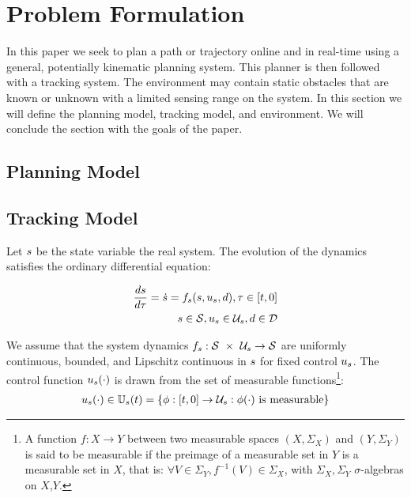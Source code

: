 \section{Problem Formulation \label{sec:formulation}}
In this paper we seek to plan a path or trajectory online and in real-time using a general, potentially kinematic planning system. This planner is then followed with a tracking system. The environment may contain static obstacles that are known or unknown with a limited sensing range on the system. In this section we will define the planning model, tracking model, and environment. We will conclude the section with the goals of the paper.

\subsection{Planning Model}


\subsection{Tracking Model}
Let $s$ be the state variable the real system. The evolution of the dynamics satisfies the ordinary differential equation:

\begin{equation}
\begin{aligned}
\label{eq:fdyn}
\frac{ds}{d\tau} = \dot{s} = f_s(s, u_s, d), \tau \in [t, 0] \\
s \in \mathcal{S}, u_s \in \mathcal{U}_s, d \in \mathcal{D}
\end{aligned}
\end{equation}

We assume that the system dynamics $f_s : \mathcal{S}\ \times\ \mathcal{U}_s \rightarrow \mathcal{S}$ are uniformly continuous, bounded, and Lipschitz continuous in $s$ for fixed control $u_s$. The control function $u_s(\cdot)$ is drawn from the set of measurable functions\footnote{A function $f:X\to Y$ between two measurable spaces $(X,\Sigma_X)$ and $(Y,\Sigma_Y)$ is said to be measurable if the preimage of a measurable set in $Y$ is a measurable set in $X$, that is: $\forall V\in\Sigma_Y, f^{-1}(V)\in\Sigma_X$, with $\Sigma_X,\Sigma_Y$ $\sigma$-algebras on $X$,$Y$.}:
\begin{equation}
\begin{aligned}
u_s(\cdot) \in \mathbb{U}_s(t) = \{\phi: [t, 0] \rightarrow \mathcal{U}_s: \phi(\cdot) \text{ is measurable}\}
\end{aligned}
\end{equation}

